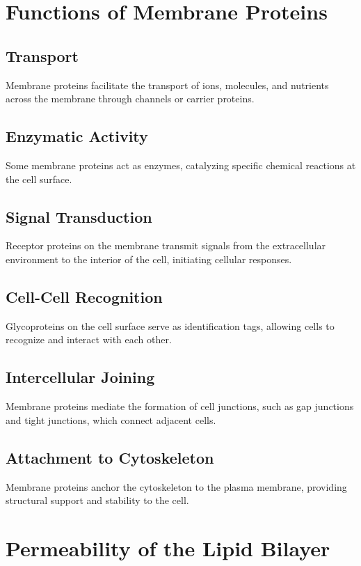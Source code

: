 \documentclass{article}
\begin{document}
\section*{Functions of Membrane Proteins}

\subsection{Transport}
Membrane proteins facilitate the transport of ions, molecules, and nutrients across the membrane through channels or carrier proteins.

\subsection{Enzymatic Activity}
Some membrane proteins act as enzymes, catalyzing specific chemical reactions at the cell surface.

\subsection{Signal Transduction}
Receptor proteins on the membrane transmit signals from the extracellular environment to the interior of the cell, initiating cellular responses.

\subsection{Cell-Cell Recognition}
Glycoproteins on the cell surface serve as identification tags, allowing cells to recognize and interact with each other.

\subsection{Intercellular Joining}
Membrane proteins mediate the formation of cell junctions, such as gap junctions and tight junctions, which connect adjacent cells.

\subsection{Attachment to Cytoskeleton}
Membrane proteins anchor the cytoskeleton to the plasma membrane, providing structural support and stability to the cell.

\section*{Permeability of the Lipid Bilayer}
\end{document}
